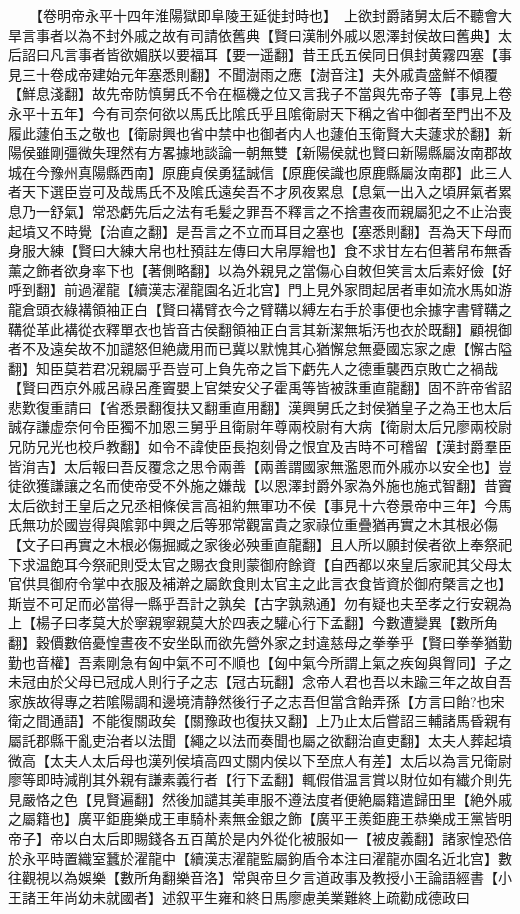 　　【卷明帝永平十四年淮陽獄即阜陵王延徙封時也】　上欲封爵諸舅太后不聽會大旱言事者以為不封外戚之故有司請依舊典【賢曰漢制外戚以恩澤封侯故曰舊典】太后詔曰凡言事者皆欲媚朕以要福耳【要一遥翻】昔王氏五侯同日俱封黄霧四塞【事見三十卷成帝建始元年塞悉則翻】不聞澍雨之應【澍音注】夫外戚貴盛鮮不傾覆【鮮息淺翻】故先帝防慎舅氏不令在樞機之位又言我子不當與先帝子等【事見上卷永平十五年】今有司奈何欲以馬氏比隂氏乎且隂衛尉天下稱之省中御者至門出不及履此蘧伯玉之敬也【衛尉興也省中禁中也御者内人也蘧伯玉衛賢大夫蘧求於翻】新陽侯雖剛彊微失理然有方畧據地談論一朝無雙【新陽侯就也賢曰新陽縣屬汝南郡故城在今豫州真陽縣西南】原鹿貞侯勇猛誠信【原鹿侯識也原鹿縣屬汝南郡】此三人者天下選臣豈可及哉馬氏不及隂氏遠矣吾不才夙夜累息【息氣一出入之頃屛氣者累息乃一舒氣】常恐虧先后之法有毛髪之罪吾不釋言之不捨晝夜而親屬犯之不止治喪起墳又不時覺【治直之翻】是吾言之不立而耳目之塞也【塞悉則翻】吾為天下母而身服大練【賢曰大練大帛也杜預註左傳曰大帛厚繒也】食不求甘左右但著帠布無香薰之飾者欲身率下也【著側略翻】以為外親見之當傷心自敇但笑言太后素好儉【好呼到翻】前過濯龍【續漢志濯龍園名近北宫】門上見外家問起居者車如流水馬如游龍倉頭衣綠褠領袖正白【賢曰褠臂衣今之臂鞲以縛左右手於事便也余據字書臂鞲之鞲從革此褠從衣釋單衣也皆音古侯翻領袖正白言其新潔無垢汚也衣於既翻】顧視御者不及遠矣故不加譴怒但絶歲用而已冀以默愧其心猶懈怠無憂國忘家之慮【懈古隘翻】知臣莫若君况親屬乎吾豈可上負先帝之旨下虧先人之德重襲西京敗亡之禍哉【賢曰西京外戚呂祿呂產竇嬰上官桀安父子霍禹等皆被誅重直龍翻】固不許帝省詔悲歎復重請曰【省悉景翻復扶又翻重直用翻】漢興舅氏之封侯猶皇子之為王也太后誠存謙虚奈何令臣獨不加恩三舅乎且衛尉年尊兩校尉有大病【衛尉太后兄廖兩校尉兄防兄光也校戶教翻】如令不諱使臣長抱刻骨之恨宜及吉時不可稽留【漢封爵羣臣皆㳙吉】太后報曰吾反覆念之思令兩善【兩善謂國家無濫恩而外戚亦以安全也】豈徒欲獲謙讓之名而使帝受不外施之嫌哉【以恩澤封爵外家為外施也施式智翻】昔竇太后欲封王皇后之兄丞相條侯言高祖約無軍功不侯【事見十六卷景帝中三年】今馬氏無功於國豈得與隂郭中興之后等邪常觀富貴之家祿位重疊猶再實之木其根必傷【文子曰再實之木根必傷掘臧之家後必殃重直龍翻】且人所以願封侯者欲上奉祭祀下求温飽耳今祭祀則受太官之賜衣食則蒙御府餘資【自西都以來皇后家祀其父母太官供具御府令掌中衣服及補澣之屬飲食則太官主之此言衣食皆資於御府槩言之也】斯豈不可足而必當得一縣乎吾計之孰矣【古字孰熟通】勿有疑也夫至孝之行安親為上【楊子曰孝莫大於寧親寧親莫大於四表之驩心行下孟翻】今數遭變異【數所角翻】穀價數倍憂惶晝夜不安坐臥而欲先營外家之封違慈母之拳拳乎【賢曰拳拳猶勤勤也音權】吾素剛急有匈中氣不可不順也【匈中氣今所謂上氣之疾匈與胷同】子之未冠由於父母已冠成人則行子之志【冠古玩翻】念帝人君也吾以未踰三年之故自吾家族故得專之若隂陽調和邊境清静然後行子之志吾但當含飴弄孫【方言曰飴?也宋衛之間通語】不能復關政矣【關豫政也復扶又翻】上乃止太后嘗詔三輔諸馬昏親有屬託郡縣干亂吏治者以法聞【繩之以法而奏聞也屬之欲翻治直吏翻】太夫人葬起墳微高【太夫人太后母也漢列侯墳高四丈關内侯以下至庶人有差】太后以為言兄衛尉廖等即時減削其外親有謙素義行者【行下孟翻】輒假借温言賞以財位如有纎介則先見嚴恪之色【見賢遍翻】然後加譴其美車服不遵法度者便絶屬籍遣歸田里【絶外戚之屬籍也】廣平鉅鹿樂成王車騎朴素無金銀之飾【廣平王羨鉅鹿王恭樂成王黨皆明帝子】帝以白太后即賜錢各五百萬於是内外從化被服如一【被皮義翻】諸家惶恐倍於永平時置織室蠶於濯龍中【續漢志濯龍監屬鉤盾令本注曰濯龍亦園名近北宫】數往觀視以為娛樂【數所角翻樂音洛】常與帝旦夕言道政事及教授小王論語經書【小王諸王年尚幼未就國者】述叙平生雍和終日馬廖慮美業難終上疏勸成德政曰